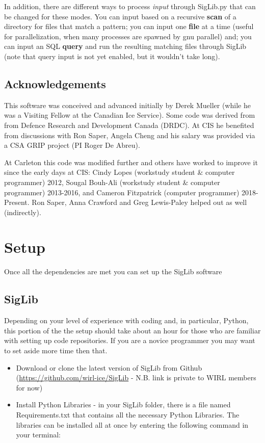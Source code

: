 \documentclass[letterpaper,10pt,openany,oneside]{sphinxmanual}
\begin{document}
In addition, there are different ways to process \emph{input} through
SigLib.py that can be changed for these modes. You can input based on a
recursive \textbf{scan} of a directory for files that match a pattern; you
can input one \textbf{file} at a time (useful for parallelization, when many
processes are spawned by gnu parallel) and; you can input an SQL
\textbf{query} and run the resulting matching files through SigLib (note that
query input is not yet enabled, but it wouldn't take long).


\section{Acknowledgements}
\label{intro:acknowledgements}
This software was conceived and advanced initially by Derek Mueller
(while he was a Visiting Fellow at the Canadian Ice Service). Some code
was derived from from Defence Research and Development Canada (DRDC). At
CIS he benefited from discussions with Ron Saper, Angela Cheng and his salary
was provided via a CSA GRIP project (PI Roger De Abreu).

At Carleton this code was modified further and others have worked to
improve it since the early days at CIS: Cindy Lopes (workstudy student \&
computer programmer) 2012, Sougal Bouh-Ali (workstudy student \& computer
programmer) 2013-2016, and Cameron Fitzpatrick (computer programmer) 2018-Present.
Ron Saper, Anna Crawford and Greg Lewis-Paley helped out as well (indirectly).


\chapter{Setup}
\label{wiki:setup}\label{wiki::doc}
Once all the dependencies are met you can set up the SigLib software


\section{SigLib}
\label{wiki:siglib}
Depending on your level of experience with coding and, in particular,
Python, this portion of the the setup should take about an hour for
those who are familiar with setting up code repositories. If you are a
novice programmer you may want to set aside more time then that.
\begin{itemize}
\item {} 
Download or clone the latest version of SigLib from Github
(\href{https://github.com/wirl-ice/SigLib}{https://github.com/wirl-ice/SigLib} - N.B. link is private to WIRL
members for now)

\item {} 
Install Python Libraries - in your SigLib folder, there is a file
named Requirements.txt that contains all the necessary Python
Libraries. The libraries can be installed all at once by entering the
following command in your terminal:

\end{itemize}
\end{document}
